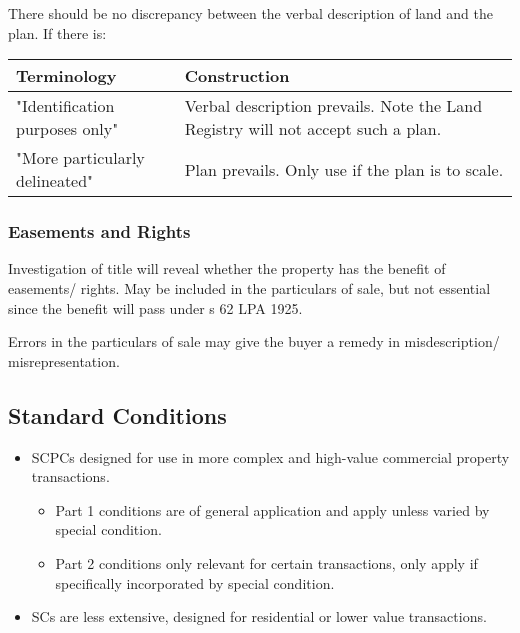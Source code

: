 \documentclass[
]{article}
\providecommand{\tightlist}{%
  \setlength{\itemsep}{0pt}\setlength{\parskip}{0pt}}
\begin{document}
There should be no discrepancy between the verbal description of land
and the plan. If there is:

\begin{longtable}[]{@{}ll@{}}
\toprule()
Terminology & Construction \\
\midrule()
\endhead
"Identification purposes only" & Verbal description prevails. Note the
Land Registry will not accept such a plan. \\
"More particularly delineated" & Plan prevails. Only use if the plan is
to scale. \\
\bottomrule()
\end{longtable}

\hypertarget{easements-and-rights}{%
\subsubsection{Easements and Rights}\label{easements-and-rights}}

Investigation of title will reveal whether the property has the benefit
of easements/ rights. May be included in the particulars of sale, but
not essential since the benefit will pass under s 62 LPA 1925.

Errors in the particulars of sale may give the buyer a remedy in
misdescription/ misrepresentation.

\hypertarget{standard-conditions}{%
\subsection{Standard Conditions}\label{standard-conditions}}

\begin{itemize}
\tightlist
\item
  SCPCs designed for use in more complex and high-value commercial
  property transactions.

  \begin{itemize}
  \tightlist
  \item
    Part 1 conditions are of general application and apply unless varied
    by special condition.
  \item
    Part 2 conditions only relevant for certain transactions, only apply
    if specifically incorporated by special condition.
  \end{itemize}
\item
  SCs are less extensive, designed for residential or lower value
  transactions.
\end{itemize}
\end{document}
